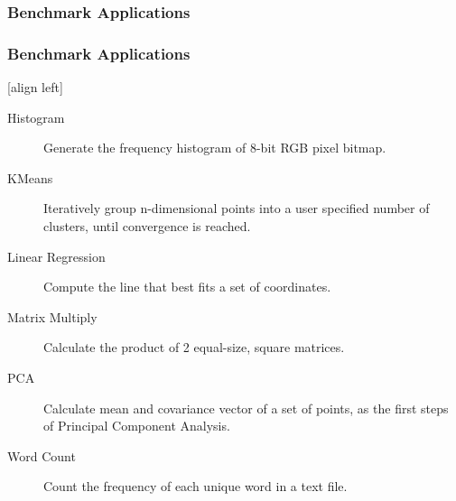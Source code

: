 \subsubsection*{Benchmark Applications}
\begin{frame}
	\frametitle{Benchmark Applications }
	[align left]
	\begin{description}
		\item[Histogram] Generate the frequency histogram of 8-bit RGB pixel bitmap.
		\item[KMeans] Iteratively group n-dimensional points into a user specified number of clusters, until convergence is reached.
		\item[Linear Regression] Compute the line that best fits a set of coordinates.
		\item[Matrix Multiply] Calculate the product of 2 equal-size, square matrices.
		\item[PCA] Calculate mean and covariance vector of a set of points, as the first steps of Principal Component Analysis.
		\item[Word Count] Count the frequency of each unique word in a text file.
	\end{description}
\end{frame}

